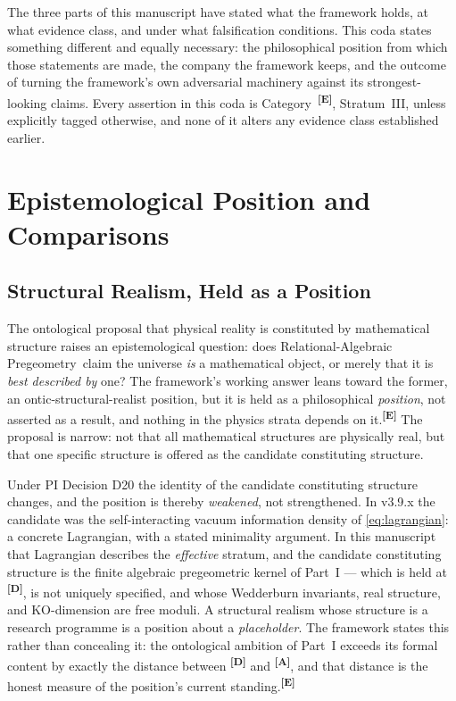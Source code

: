 \documentclass[12pt,a4paper,twoside]{article}
\theoremstyle{plain}
\theoremstyle{definition}
\theoremstyle{remark}
\newcommand{\ProjectShort}{Relational-Algebraic Pregeometry}
\newcommand{\RAP}{\ProjectShort}
\newcommand{\catmark}[1]{\textsuperscript{\textsf{\textbf{[#1]}}}}
\begin{document}
\noindent The three parts of this manuscript have stated what the framework
holds, at what evidence class, and under what falsification conditions.
This coda states something different and equally necessary: the
philosophical position from which those statements are made, the company
the framework keeps, and the outcome of turning the framework's own
adversarial machinery against its strongest-looking claims. Every
assertion in this coda is Category~\catmark{E}, Stratum~III, unless
explicitly tagged otherwise, and none of it alters any evidence class
established earlier.

\section{Epistemological Position and Comparisons}
\label{sec:epistemology}

\subsection{Structural Realism, Held as a Position}
\label{subsec:structural-realism}

The ontological proposal that physical reality is constituted by
mathematical structure raises an epistemological question: does \RAP\
claim the universe \emph{is} a mathematical object, or merely that it is
\emph{best described by} one? The framework's working answer leans toward
the former, an ontic-structural-realist position, but it is held as a
philosophical \emph{position}, not asserted as a result, and nothing in
the physics strata depends on it.\catmark{E} The proposal is narrow: not
that all mathematical structures are physically real, but that one
specific structure is offered as the candidate constituting structure.

\begin{governancebox}[What D20 Does to the Structural-Realist Position]
Under PI Decision D20 the identity of the candidate constituting
structure changes, and the position is thereby \emph{weakened}, not
strengthened. In v3.9.x the candidate was the self-interacting vacuum
information density of \cref{eq:lagrangian}: a concrete Lagrangian, with
a stated minimality argument. In this manuscript that Lagrangian describes the
\emph{effective} stratum, and the candidate constituting structure is the
finite algebraic pregeometric kernel of Part~I --- which is held at
\catmark{D}, is not uniquely specified, and whose Wedderburn invariants,
real structure, and KO-dimension are free moduli. A structural realism
whose structure is a research programme is a position about a
\emph{placeholder}. The framework states this rather than concealing it:
the ontological ambition of Part~I exceeds its formal content by exactly
the distance between \catmark{D} and \catmark{A}, and that distance is
the honest measure of the position's current standing.\catmark{E}
\end{governancebox}
\end{document}
